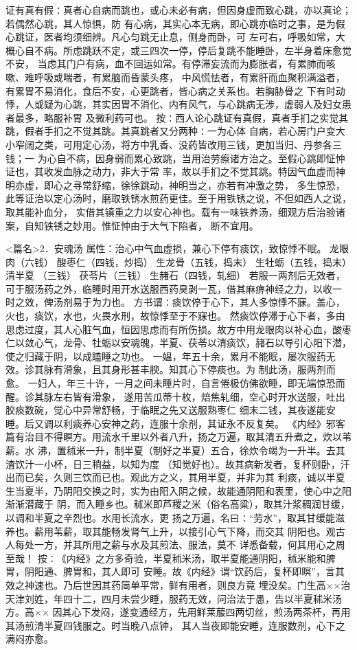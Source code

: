 \documentclass[a4paper,12pt,UTF8,twoside]{ctexbook}
\begin{document}
证有真有假∶真者心自病而跳也，或心未必有病，但因身虚而致心跳，亦以真论；若偶然心跳，其人惊惧，防 
有心病，其实心本无病，即心跳亦临时之事，是为假心跳证，医者均须细辨。凡心匀跳无止息，侧身而卧，可 
左可右，呼吸如常，大概心自不病。所虑跳跃不定，或三四次一停，停后复跳不能睡卧，左半身着床愈觉不安， 
当虑其门户有病，血不回运如常。有停滞妄流而为膨胀者，有累肺而咳嗽、难呼吸或喘者，有累脑而昏蒙头疼， 
中风慌怯者，有累肝而血聚积满溢者，有累胃不易消化，食后不安，心更跳者，皆心病之关系也。若胸胁骨之 
下有时动悸，人或疑为心跳，其实因胃不消化、内有风气，与心跳病无涉，虚弱人及妇女患者最多，略服补胃 
及微利药可也。 
按∶西人论心跳证有真假，真者手扪之实觉其跳，假者手扪之不觉其跳。其真跳者又分两种∶一为心体 
自病，若心房门户变大小窄阔之类，可用定心汤，将方中乳香、没药皆改用三钱，更加当归、丹参各三钱；一 
为心自不病，因身弱而累心致跳，当用治劳瘵诸方治之。至假心跳即怔忡证也，其收发血脉之动力，非大于常 
率，故以手扪之不觉其跳。特因气血虚而神明亦虚，即心之寻常舒缩，徐徐跳动，神明当之，亦若有冲激之势， 
多生惊恐，此等证治以定心汤时，磨取铁锈水煎药更佳。至于用铁锈之说，不但如西人之说，取其能补血分， 
实借其镇重之力以安心神也。载有一味铁养汤，细观方后治验诸案，自知铁锈之妙用。惟怔忡由于大气下陷者， 
断不宜用。 


<篇名>2．安魂汤
属性：治心中气血虚损，兼心下停有痰饮，致惊悸不眠。 
龙眼肉（六钱） 酸枣仁（四钱，炒捣） 生龙骨（五钱，捣末） 生牡蛎（五钱，捣末） 清半夏 
（三钱） 茯苓片（三钱） 生赭石（四钱，轧细） 
若服一两剂后无效者，可于服汤药之外，临睡时用开水送服西药臭剥一瓦，借其麻痹神经之力，以收一 
时之效，俾汤剂易于为力也。 
方书谓∶痰饮停于心下，其人多惊悸不寐。盖心，火也，痰饮，水也，火畏水刑，故惊悸至于不寐也。 
然痰饮停滞于心下者，多由思虑过度，其人心脏气血，恒因思虑而有所伤损。故方中用龙眼肉以补心血，酸枣 
仁以敛心气，龙骨、牡蛎以安魂魄，半夏、茯苓以清痰饮，赭石以导引心阳下潜，使之归藏于阴，以成瞌睡之功也。 
一媪，年五十余，累月不能眠，屡次服药无效。诊其脉有滑象，且其身形甚丰腴。知其心下停痰也。为 
制此汤，服两剂而愈。 
一妇人，年三十许，一月之间未睡片时，自言倦极仿佛欲睡，即无端惊恐而醒。诊其脉左右皆有滑象， 
遂用苦瓜蒂十枚，焙焦轧细，空心时开水送服，吐出胶痰数碗，觉心中异常舒畅，于临眠之先又送服熟枣仁 
细末二钱，其夜遂能安睡。后又调以利痰养心安神之药，连服十余剂，其证永不反复矣。 
《内经》邪客篇有治目不得瞑方。用流水千里以外者八升，扬之万遍，取其清五升煮之，炊以苇薪。水 
沸，置秫米一升，制半夏（制好之半夏）五合，徐炊令竭为一升半。去其渣饮汁一小杯，日三稍益，以知为度 
（知觉好也）。故其病新发者，复杯则卧，汗出而已矣，久则三饮而已也。观此方之义，其用半夏，并非为其 
利痰，诚以半夏生当夏半，乃阴阳交换之时，实为由阳入阴之候，故能通阴阳和表里，使心中之阳渐渐潜藏于 
阴，而入睡乡也。秫米即芦稷之米（俗名高粱），取其汁浆稠润甘缓，以调和半夏之辛烈也。水用长流水，更 
扬之万遍，名曰∶“劳水”，取其甘缓能滋养也。薪用苇薪，取其能畅发肾气上升，以接引心气下降，而交其 
阴阳也。观古人每处一方，并其所用之薪与水及其煎法、服法，莫不 
详悉备载，何其用心之周至哉！ 
按∶《内经》之方多奇验，半夏秫米汤，取半夏能通阴阳，秫米能和脾胃，阴阳通、脾胃和，其人即可 
安睡。故《内经》谓“饮药后，复杯即瞑”，言其效之神速也。乃后世因其药简单平常，鲜有用者，则良方竟 
埋没矣。门生高××治天津刘姓，年四十二，四月未尝少睡，服药无效，问治法于愚，告以半夏秫米汤方。高×× 
因其心下发闷，遂变通经方，先用鲜莱菔四两切丝，煎汤两茶杯，再用其汤煎清半夏四钱服之。时当晚八点钟， 
其人当夜即能安睡，连服数剂，心下之满闷亦愈。 
\end{document}
